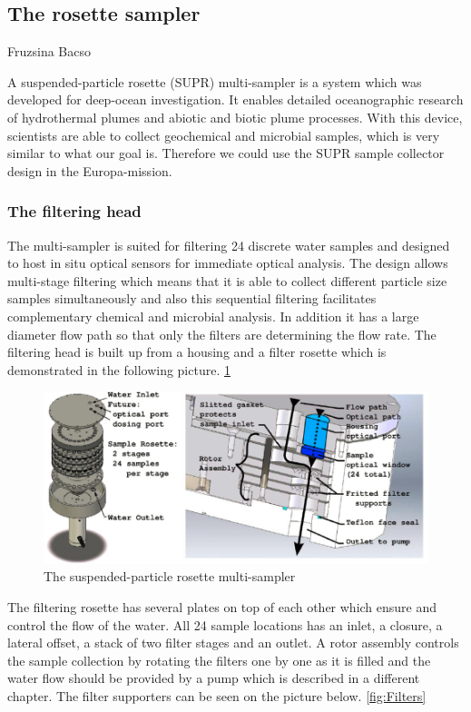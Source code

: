 \subsection{The rosette sampler}{Fruzsina Bacso}

A suspended-particle rosette (SUPR) multi-sampler is a system which was developed for deep-ocean investigation. It enables detailed oceanographic research of hydrothermal plumes and abiotic and biotic plume processes. With this device, scientists are able to collect geochemical and microbial samples, which is very similar to what our goal is. Therefore we could use the SUPR sample collector design in the Europa-mission.
\cite{Breier20091579}

\subsubsection{The filtering head}
The multi-sampler is suited for filtering 24 discrete water samples and designed to host in situ optical sensors for immediate optical analysis.
The design allows multi-stage filtering which means that it is able to collect different particle size samples simultaneously and also this sequential filtering facilitates complementary chemical and microbial analysis. In addition it has a large diameter flow path so that only the filters are determining the flow rate.
The filtering head is built up from a housing and a filter rosette which is demonstrated in the following picture. 
\ref{fig:SUPR_head}

\begin{figure}[htb]
  \centering
  \includegraphics[scale=0.65]{figures/BFfig/SUPR_head}
  \caption{The suspended-particle rosette multi-sampler  }
  \label{fig:SUPR_head}
\end{figure}

The filtering rosette has several plates on top of each other which ensure and control the flow of the water. All 24 sample locations has an inlet, a closure, a lateral offset, a stack of two filter stages and an outlet. A rotor assembly controls the sample collection by rotating the filters one by one as it is filled and the water flow should be provided by a pump which is described in a different chapter.
The filter supporters can be seen on the picture below. 
\ref{fig:Filters}

